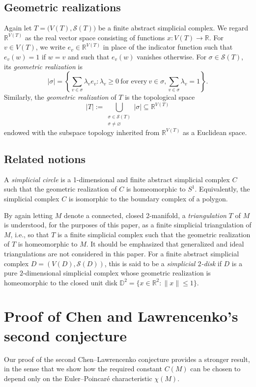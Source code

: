\documentclass[10pt,a4paper]{amsart}
\begin{document}
\subsection{Geometric realizations}
 Again let $T = \big( V(T), \mathcal{S}(T) \big)$ be a finite abstract simplicial complex. 
 We regard $\mathbb{R}^{V(T)}$ as the real vector space consisting of functions $x\colon V(T) \to \mathbb{R}$.
 For $v \in V(T)$, we write $e_{v} \in \mathbb{R}^{V(T)}$
 in place of the indicator function such that $e_{v}(w) = 1$ if $w = v$ and such that 
 $e_{v}(w)$ vanishes otherwise. For $\sigma \in \mathcal{S}(T)$, its \emph{geometric realization} is 
 $$ \left| \sigma \right| 
 = \left\{ \sum_{v \in \sigma} \lambda_{v} e_{v} : \lambda_{v} \geq 0 \ \text{for every} \ v \in \sigma, 
 \sum_{v \in \sigma} \lambda_{v} = 1 \right\}. $$
 Similarly, the \emph{geometric realization} of $T$ is the topological space
 $$ |T| := \bigcup_{\substack{\sigma \in \mathcal{S}(T) \\ \sigma \neq \varnothing }} 
 \left| \sigma \right| \subseteq \mathbb{R}^{V(T)} $$
 endowed with the subspace topology
 inherited from $\mathbb{R}^{V(T)}$ as a Euclidean space. 

\subsection{Related notions}
 A \emph{simplicial circle} is a 1-dimensional and finite abstract simplicial complex $C$ such that the geometric
 realization of $C$ is homeomorphic to $S^1$. Equivalently, the simplicial complex $C$ is isomorphic to the 
 boundary complex of a polygon. 

 By again letting $M$ denote a connected, closed 2-manifold, a 
 \emph{triangulation} $T$ of $M$
 is understood, for the purposes of this paper, as a finite simplicial triangulation of $M$, i.e., 
 so that $T$
 is a finite simplicial complex such that the geometric realization of $T$ is homeomorphic to $M$. 
 It should be emphasized that generalized and ideal triangulations are not considered in this paper. 
 For a finite abstract simplicial complex $D = (V(D), \mathcal{S}(D))$, 
 this is said to be a \emph{simplicial $2$-disk} if $D$ is a pure $2$-dimensional simplicial complex whose geometric realization is 
 homeomorphic to the closed unit disk 
 $\mathbb{D}^{2} = \{ x \in \mathbb{R}^{2} : \| x \| \leq 1 \}$. 

\section{Proof of Chen and Lawrencenko's second conjecture}\label{secproof}
 Our proof of the second Chen--Lawrencenko conjecture \cite[Conjecture 2]{ChenLawrencenko1999} provides a 
 stronger result, in the sense that we show how the required constant $C(M)$ 
 can be chosen to depend only on the Euler--Poincar\'{e} characteristic $\chi(M)$. 
\end{document}
